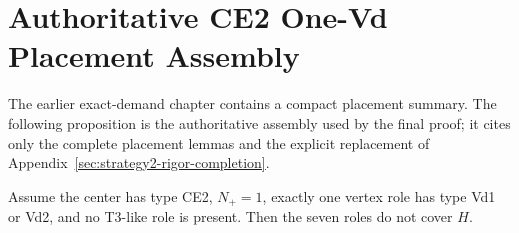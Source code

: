 \section{Authoritative CE2 One-Vd Placement Assembly}
\label{sec:strategy2-placement-assembly}

The earlier exact-demand chapter contains a compact placement summary.  The
following proposition is the authoritative assembly used by the final proof;
it cites only the complete placement lemmas and the explicit replacement of
Appendix~\ref{sec:strategy2-rigor-completion}.

\begin{proposition}
\label{prop:paper-ce2-one-vd-placements}
Assume the center has type CE2, $N_+=1$, exactly one vertex role has type Vd1
or Vd2, and no T3-like role is present.  Then the seven roles do not cover
$H$.
\end{proposition}

